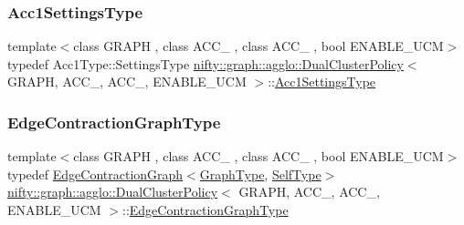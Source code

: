 \subsubsection{\texorpdfstring{Acc1\+Settings\+Type}{Acc1SettingsType}}
{\footnotesize\ttfamily template$<$class G\+R\+A\+PH , class A\+C\+C\+\_ , class A\+C\+C\+\_ , bool E\+N\+A\+B\+L\+E\+\_\+\+U\+CM$>$ \\
typedef Acc1\+Type\+::\+Settings\+Type \hyperlink{classnifty_1_1graph_1_1agglo_1_1DualClusterPolicy}{nifty\+::graph\+::agglo\+::\+Dual\+Cluster\+Policy}$<$ G\+R\+A\+PH, A\+C\+C\+\_, A\+C\+C\+\_, E\+N\+A\+B\+L\+E\+\_\+\+U\+CM $>$\+::\hyperlink{classnifty_1_1graph_1_1agglo_1_1DualClusterPolicy_a9e9443784c4c09926fd8c97608547779}{Acc1\+Settings\+Type}}

\mbox{\label{classnifty_1_1graph_1_1agglo_1_1DualClusterPolicy_a50412f31fd3dc355ef0804cb8d753c05}} 
\subsubsection{\texorpdfstring{Edge\+Contraction\+Graph\+Type}{EdgeContractionGraphType}}
{\footnotesize\ttfamily template$<$class G\+R\+A\+PH , class A\+C\+C\+\_ , class A\+C\+C\+\_ , bool E\+N\+A\+B\+L\+E\+\_\+\+U\+CM$>$ \\
typedef \hyperlink{classnifty_1_1graph_1_1EdgeContractionGraph}{Edge\+Contraction\+Graph}$<$\hyperlink{classnifty_1_1graph_1_1agglo_1_1DualClusterPolicy_ad8e19fe87ad08f4187fdb79c1367389a}{Graph\+Type}, \hyperlink{classnifty_1_1graph_1_1agglo_1_1DualClusterPolicy}{Self\+Type}$>$ \hyperlink{classnifty_1_1graph_1_1agglo_1_1DualClusterPolicy}{nifty\+::graph\+::agglo\+::\+Dual\+Cluster\+Policy}$<$ G\+R\+A\+PH, A\+C\+C\+\_, A\+C\+C\+\_, E\+N\+A\+B\+L\+E\+\_\+\+U\+CM $>$\+::\hyperlink{classnifty_1_1graph_1_1agglo_1_1DualClusterPolicy_a50412f31fd3dc355ef0804cb8d753c05}{Edge\+Contraction\+Graph\+Type}}

\mbox{\label{classnifty_1_1graph_1_1agglo_1_1DualClusterPolicy_a54d7666f80620939d704938530b7564a}} 
